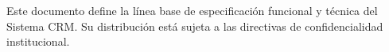 \begin{titlepage}
\begin{flushleft}
\begin{minipage}{0.88\textwidth}
            \vfill
            
            {\small\sffamily\textcolor{MutedText}{
                Este documento define la línea base de especificación funcional y técnica del Sistema CRM.
                Su distribución está sujeta a las directivas de confidencialidad institucional.
            }}
        \end{minipage}
    \end{flushleft}
\end{titlepage}
\hypersetup{pageanchor=true}
